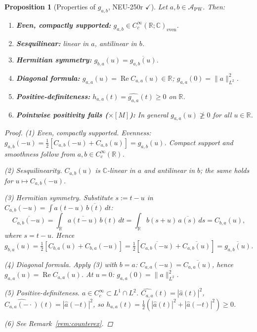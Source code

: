 \documentclass[11pt,a4paper]{amsart}
\newtheorem{proposition}[theorem]{Proposition}
\begin{document}
\begin{proposition}[Properties of $g_{a,b}$, NEU-250r $\checkmark$]
\label{prop:gab}
Let $a,b\in\mathcal{A}_{\mathrm{PW}}$. Then:
\begin{enumerate}
\item \textbf{Even, compactly supported:}
  $g_{a,b}\in C_c^\infty(\mathbb{R};\mathbb{C})_{\mathrm{even}}$.
\item \textbf{Sesquilinear:} linear in $a$, antilinear in $b$.
\item \textbf{Hermitian symmetry:}
  $g_{b,a}(u) = \overline{g_{a,b}(u)}$.
\item \textbf{Diagonal formula:}
  $g_{a,a}(u) = \operatorname{Re}C_{a,a}(u)\in\mathbb{R}$;
  $g_{a,a}(0)=\|a\|_{L^2}^2$.
\item \textbf{Positive-definiteness:}
  $h_{a,a}(t)=\widehat{g_{a,a}}(t)\ge 0$ on $\mathbb{R}$.
\item \textbf{Pointwise positivity fails ($\times[M]$):}
  In general $g_{a,a}(u)\not\ge0$ for all $u\in\mathbb{R}$.
\end{enumerate}
\begin{proof}
\textit{(1) Even, compactly supported.}
Evenness: $g_{a,b}(-u)=\tfrac12[C_{a,b}(-u)+C_{a,b}(u)]=g_{a,b}(u)$.
Compact support and smoothness follow from $a,b\in C_c^\infty(\mathbb{R})$.

\textit{(2) Sesquilinearity.}
$C_{a,b}(u)$ is $\mathbb{C}$-linear in $a$ and antilinear in $b$;
the same holds for $u\mapsto C_{a,b}(-u)$.

\textit{(3) Hermitian symmetry.}
Substitute $s:=t-u$ in $C_{a,b}(-u)=\int a(t-u)\,\overline{b(t)}\,dt$:
\[
  \overline{C_{a,b}(-u)}
  = \int_{\mathbb{R}} \overline{a(t-u)}\,b(t)\,dt
  = \int_{\mathbb{R}} b(s+u)\,\overline{a(s)}\,ds
  = C_{b,a}(u),
\]
where $s=t-u$. Hence
$g_{b,a}(u)=\tfrac12[C_{b,a}(u)+C_{b,a}(-u)]
=\tfrac12[\overline{C_{a,b}(-u)}+\overline{C_{a,b}(u)}]=\overline{g_{a,b}(u)}$.

\textit{(4) Diagonal formula.}
Apply (3) with $b=a$:
$C_{a,a}(-u)=\overline{C_{a,a}(u)}$,
hence $g_{a,a}(u)=\operatorname{Re}C_{a,a}(u)$.
At $u=0$: $g_{a,a}(0)=\|a\|_{L^2}^2$.

\textit{(5) Positive-definiteness.}
$a\in C_c^\infty\subset L^1\cap L^2$.
$\widehat{C_{a,a}}(t)=|\hat a(t)|^2$,
$\widehat{C_{a,a}(-\cdot)}(t)=|\hat a(-t)|^2$,
so $h_{a,a}(t)=\tfrac12(|\hat a(t)|^2+|\hat a(-t)|^2)\ge0$.

\textit{(6)} See Remark~\ref{rem:counterex}.
\end{proof}
\end{proposition}
\end{document}
